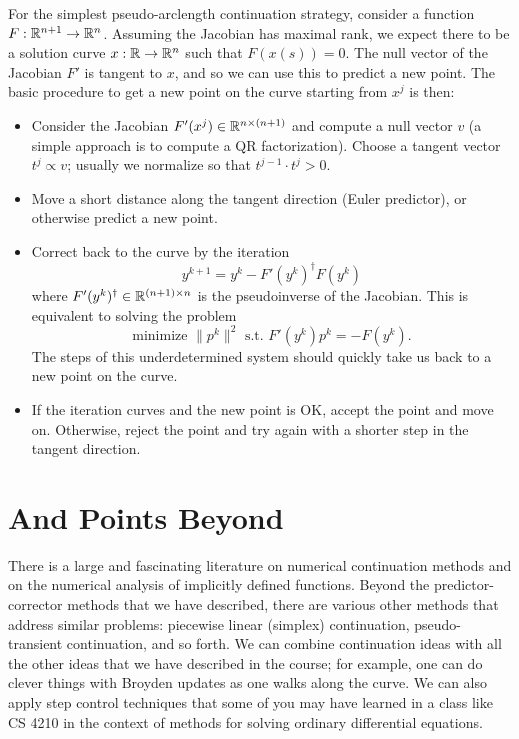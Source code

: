 \documentclass[12pt, leqno]{article} %
\begin{document}
For the simplest pseudo-arclength continuation strategy, consider
a function $F : \mathbb{R}^{n+1} \rightarrow \mathbb{R}^n$.  Assuming the
Jacobian has maximal rank, we expect there to be a solution curve
$x : \mathbb{R} \rightarrow \mathbb{R}^n$ such that $F(x(s)) = 0$.
The null vector of the Jacobian $F'$ is tangent to $x$, and so
we can use this to predict a new point.  The basic procedure
to get a new point on the curve starting from $x^j$ is then:
\begin{itemize}
\item
  Consider the Jacobian $F'(x^j) \in \mathbb{R}^{n \times (n+1)}$ and
  compute a null vector $v$ (a simple approach is to compute a
  QR factorization).  Choose a tangent vector $t^j \propto v$;
  usually we normalize so that $t^{j-1} \cdot t^j > 0$.
\item
  Move a short distance along the tangent direction (Euler predictor),
  or otherwise predict a new point.
\item
  Correct back to the curve by the iteration
  \[
    y^{k+1} = y^k - F'(y^k)^\dagger F(y^k)
  \]
  where $F'(y^k)^\dagger \in \mathbb{R}^{(n+1) \times n}$ is the
  pseudoinverse of the Jacobian.  This is equivalent to solving
  the problem
  \[
    \mbox{minimize } \|p^k\|^2 \mbox{ s.t. } F'(y^k) p^k = -F(y^k).
  \]
  The steps of this underdetermined system should quickly take us back to
  a new point on the curve.
\item
  If the iteration curves and the new point is OK, accept the point
  and move on.  Otherwise, reject the point and try again with a
  shorter step in the tangent direction.
\end{itemize}

\section*{And Points Beyond}

There is a large and fascinating literature on numerical continuation
methods and on the numerical analysis of implicitly defined functions.
Beyond the predictor-corrector methods that we have described, there
are various other methods that address similar problems: piecewise
linear (simplex) continuation, pseudo-transient continuation, and so
forth.  We can combine continuation ideas with all the other
ideas that we have described in the course; for example, one can do
clever things with Broyden updates as one walks along the curve.
We can also apply step control techniques that some of you may have
learned in a class like CS 4210 in the context of methods for solving
ordinary differential equations.
\end{document}
